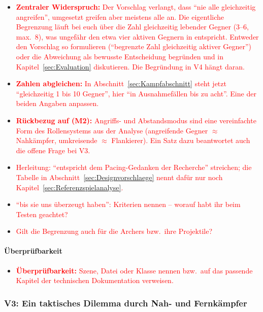 \documentclass[../Main.tex]{subfiles}
\begin{document}
\begin{itemize}[leftmargin=1.5cm]
    \item \textcolor{red}{\textbf{Zentraler Widerspruch:} Der Vorschlag verlangt, dass \enquote{nie alle gleichzeitig angreifen}, umgesetzt greifen aber meistens alle an. Die eigentliche Begrenzung läuft bei euch über die Zahl gleichzeitig lebender Gegner (3--6, max.\ 8), was ungefähr den etwa vier aktiven Gegnern in  entspricht. Entweder den Vorschlag so formulieren (\enquote{begrenzte Zahl gleichzeitig aktiver Gegner}) oder die Abweichung als bewusste Entscheidung begründen und in Kapitel~\ref{sec:Evaluation} diskutieren. Die Begründung in V4 hängt daran.}
    \item \textcolor{red}{\textbf{Zahlen abgleichen:} In Abschnitt~\ref{sec:Kampfabschnitt} steht jetzt \enquote{gleichzeitig 1 bis 10 Gegner}, hier \enquote{in Ausnahmefällen bis zu acht}. Eine der beiden Angaben anpassen.}
    \item \textcolor{red}{\textbf{Rückbezug auf  (M2):} Angriffs- und Abstandsmodus sind eine vereinfachte Form des Rollensystems aus der Analyse (angreifende Gegner $\approx$ Nahkämpfer, umkreisende $\approx$ Flankierer). Ein Satz dazu beantwortet auch die offene Frage bei V3.}
    \item \textcolor{red}{Herleitung: \enquote{entspricht dem Pacing-Gedanken der Recherche} streichen; die Tabelle in Abschnitt~\ref{sec:Designvorschlaege} nennt dafür nur noch Kapitel~\ref{sec:Referenzspielanalyse}.}
    \item \textcolor{red}{\enquote{bis sie uns überzeugt haben}: Kriterien nennen -- worauf habt ihr beim Testen geachtet?}
    \item \textcolor{red}{Gilt die Begrenzung auch für die Archers bzw.\ ihre Projektile?}
\end{itemize}

\paragraph{Überprüfbarkeit}
\begin{itemize}[leftmargin=1.5cm]
    \item \textcolor{red}{\textbf{Überprüfbarkeit:} Szene, Datei oder Klasse nennen bzw.\ auf das passende Kapitel der technischen Dokumentation verweisen.}
\end{itemize}

\subsubsection{V3: Ein taktisches Dilemma durch Nah- und Fernkämpfer} \label{sec:V3}
\end{document}
